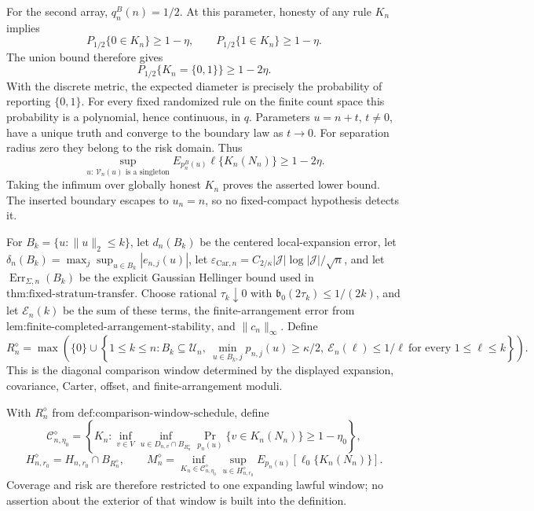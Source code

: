 For the second array, \(q_n^B(n)=1/2\). At this parameter, honesty of any rule \(K_n\) implies
\[
 P_{1/2}\{0\in K_n\}\ge1-\eta,
 \qquad P_{1/2}\{1\in K_n\}\ge1-\eta.
\]
The union bound therefore gives
\[
 P_{1/2}\{K_n=\{0,1\}\}
 \ge1-2\eta.
\]
With the discrete metric, the expected diameter is precisely the probability of reporting \(\{0,1\}\). For every fixed randomized rule on the finite count space this probability is a polynomial, hence continuous, in \(q\). Parameters \(u=n+t\), \(t\ne0\), have a unique truth and converge to the boundary law as \(t\to0\). For separation radius zero they belong to the risk domain. Thus
\[
 \sup_{u:\,\mathcal V_n(u)\text{ is a singleton}}
 E_{p_n^B(u)}\ell\{K_n(N_n)\}
 \ge1-2\eta.
\]
Taking the infimum over globally honest \(K_n\) proves the asserted lower bound. The inserted boundary escapes to \(u_n=n\), so no fixed-compact hypothesis detects it.

For \(B_k=\{u:\|u\|_2\le k\}\), let \(d_n(B_k)\) be the centered local-expansion error, let \(\delta_n(B_k)=\max_j\sup_{u\in B_k}|e_{n,j}(u)|\), let \(\varepsilon_{\mathrm{Car},n}=C_{2/\kappa}|\mathcal J|\log|\mathcal J|/\sqrt n\), and let \(\operatorname{Err}_{\Sigma,n}(B_k)\) be the explicit Gaussian Hellinger bound used in \(\text{thm:fixed-stratum-transfer}\). Choose rational \(\tau_k\downarrow0\) with \(\mathfrak b_0(2\tau_k)\le1/(2k)\), and let \(\mathscr E_n(k)\) be the sum of these terms, the finite-arrangement error from \(\text{lem:finite-completed-arrangement-stability}\), and \(\|c_n\|_\infty\). Define
\[
 R_n^{\diamond}=\max\left(\{0\}\cup\left\{1\le k\le n:
 B_k\subseteq\mathcal U_n,\ \min_{u\in B_k,j}p_{n,j}(u)\ge\kappa/2,
 \ \mathscr E_n(\ell)\le1/\ell\ \text{for every }1\le\ell\le k\right\}\right).
\]
This is the diagonal comparison window determined by the displayed expansion, covariance, Carter, offset, and finite-arrangement moduli.

With \(R_n^{\diamond}\) from \(\text{def:comparison-window-schedule}\), define
\[
 \mathcal C_{n,\eta_0}^{\diamond}
 =\left\{K_n:\inf_{v\in V}\inf_{u\in D_{n,v}\cap B_{R_n^{\diamond}}}
 \Pr_{p_n(u)}\{v\in K_n(N_n)\}\ge1-\eta_0\right\},
\]
\[
 H_{n,r_0}^{\diamond}=H_{n,r_0}\cap B_{R_n^{\diamond}},
 \qquad
 M_n^{\diamond}=\inf_{K_n\in\mathcal C_{n,\eta_0}^{\diamond}}
 \sup_{u\in H_{n,r_0}^{\diamond}}
 E_{p_n(u)}[\ell_0\{K_n(N_n)\}].
\]
Coverage and risk are therefore restricted to one expanding lawful window; no assertion about the exterior of that window is built into the definition.

